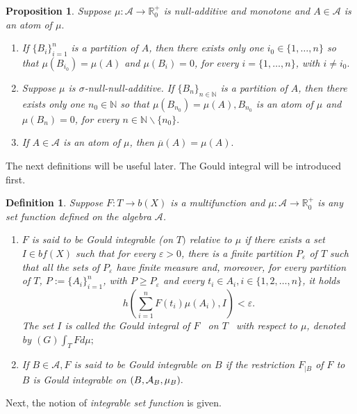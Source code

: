 \documentclass[11pt,a4paper,twoside]{amsart}
\newtheorem{definition}[theorem]{Definition}
\newtheorem{proposition}[theorem]{Proposition}
\begin{document}
\begin{proposition}\label{ex2.6}
{\rm  \cite[Proposition 2.7, Corollary 2.8]{cg2014}} Suppose $\mu :\mathcal{A}\rightarrow \mathbb{R}_0^+$ 
is null-additive and monotone and $A\in \mathcal{A}$ is an atom
of $\mu .$
\begin{enumerate}[\rm  \ref{ex2.6}.i)]
\item If $\{B_{i}\}_{i=1}^{n}$ is a partition of $A$,
then there exists only one $i_{0} \in \{ 1, \ldots, n \}$ so that $\mu (B_{i_{0}})=\mu (A)$ and 
$\mu (B_{i})=0$, for every $i=\{ 1, \ldots, n\}$, with $i\neq i_{0}.$
\item Suppose $\mu $ is $\sigma$-null-null-additive. If $\{B_{n}\}_{n\in 
\mathbb{N}}$ is a partition of $A$,
then there exists only
one $n_{0}\in \mathbb{N}$ so that $\mu (B_{n_{0}})=\mu (A),B_{n_{0}}$ is an
atom of $\mu $ and $\mu (B_{n})=0$, for every $n\in \mathbb{N}\backslash
\{n_{0}\}.$
\item If $A\in \mathcal{A}$ is an atom
of $\mu $, then $\overline{\mu }(A)=\mu (A). $
\end{enumerate}
\end{proposition}
The next definitions will be useful later.
The Gould integral will be introduced first.
\begin{definition}\label{ex3.1} \rm 
 \cite[Definition 3.6]{pgcsub} Suppose $F:T\rightarrow b(X)$ is
a multifunction and $\mu:\mathcal{A}\to \mathbb{R}^+_0$ is any
 set function defined on the algebra $\mathcal{A}$.
\begin{enumerate}[\rm \bf \ref{ex3.1}.i)]
\item  $F$ is said to be \textit{Gould integrable (on} $T)$ \textit{relative to }$\mu $ if there exists a set $I\in bf(X)$ such that for every 
$\varepsilon >0$, there is a finite partition $P_{\varepsilon }$ of 
$T$ such that all the sets of $P_{\varepsilon }$ have finite measure and, moreover,
 for every partition of $T$, $P:=\{A_{i}\}_{i=1}^{n}$, with $P\geq P_{\varepsilon }$ and
every $t_{i}\in A_{i},i\in \{1,2,\ldots,n\}$, it holds
$$h(\sum_{i=1}^n F(t_{i})\mu (A_{i}),I)<\varepsilon.$$
The set $I$ is called \textit{the Gould integral of} $F$ \textit{\ on } $T$
\textit{\ with respect to} $\mu $, denoted by $(G)\int_{T}Fd\mu ;$

\item If $B\in \mathcal{A},F$ is said to be \textit{Gould integrable on} $B$
if the restriction $F_{|B}$ of $F$ to $B$ is Gould integrable on $(B,\mathcal{A}_{B},\mu _{B}).\bigskip $
\end{enumerate}
\end{definition}
Next, the notion of {\em integrable set function} is given.
\end{document}
